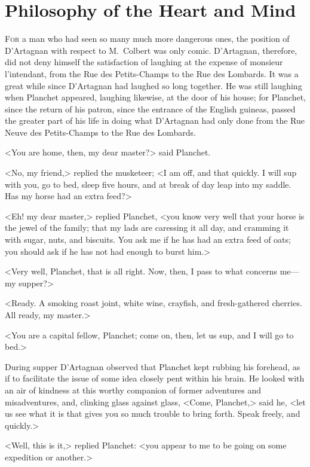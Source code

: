 \chapter{Philosophy of the Heart and Mind}

\lettrine{F}{or} a man who had seen so many much more dangerous ones, the position of D'Artagnan with respect to M.~Colbert was only comic. D'Artagnan, therefore, did not deny himself the satisfaction of laughing at the expense of monsieur l'intendant, from the Rue des Petits-Champs to the Rue des Lombards. It was a great while since D'Artagnan had laughed so long together. He was still laughing when Planchet appeared, laughing likewise, at the door of his house; for Planchet, since the return of his patron, since the entrance of the English guineas, passed the greater part of his life in doing what D'Artagnan had only done from the Rue Neuve des Petits-Champs to the Rue des Lombards.

<You are home, then, my dear master?> said Planchet.

<No, my friend,> replied the musketeer; <I am off, and that quickly. I will sup with you, go to bed, sleep five hours, and at break of day leap into my saddle. Has my horse had an extra feed?>

<Eh! my dear master,> replied Planchet, <you know very well that your horse is the jewel of the family; that my lads are caressing it all day, and cramming it with sugar, nuts, and biscuits. You ask me if he has had an extra feed of oats; you should ask if he has not had enough to burst him.>

<Very well, Planchet, that is all right. Now, then, I pass to what concerns me—my supper?>

<Ready. A smoking roast joint, white wine, crayfish, and fresh-gathered cherries. All ready, my master.>

<You are a capital fellow, Planchet; come on, then, let us sup, and I will go to bed.>

During supper D'Artagnan observed that Planchet kept rubbing his forehead, as if to facilitate the issue of some idea closely pent within his brain. He looked with an air of kindness at this worthy companion of former adventures and misadventures, and, clinking glass against glass, <Come, Planchet,> said he, <let us see what it is that gives you so much trouble to bring forth.  Speak freely, and quickly.>

<Well, this is it,> replied Planchet: <you appear to me to be going on some expedition or another.>

